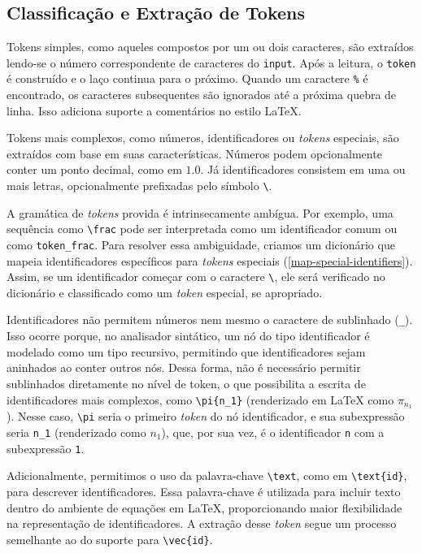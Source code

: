 \subsection{Classificação e Extração de Tokens}

Tokens simples, como aqueles compostos por um ou dois caracteres, são extraídos lendo-se o número correspondente de caracteres do \texttt{input}. Após a leitura, o \texttt{token} é construído e o laço continua para o próximo. Quando um caractere \texttt{\%} é encontrado, os caracteres subsequentes são ignorados até a próxima quebra de linha. Isso adiciona suporte a comentários no estilo \LaTeX{}.

Tokens mais complexos, como números, identificadores ou \textit{tokens} especiais, são extraídos com base em suas características. Números podem opcionalmente conter um ponto decimal, como em $1.0$. Já identificadores consistem em uma ou mais letras, opcionalmente prefixadas pelo símbolo \verb|\|.

A gramática de \textit{tokens} provida é intrinsecamente ambígua. Por exemplo, uma sequência como \verb|\frac| pode ser interpretada como um identificador comum ou como \verb"token_frac". Para resolver essa ambiguidade, criamos um dicionário que mapeia identificadores específicos para \textit{tokens} especiais (\autoref{map-special-identifiers}). Assim, se um identificador começar com o caractere \verb|\|, ele será verificado no dicionário e classificado como um \textit{token} especial, se apropriado.


\label{lexer-subexpression}
Identificadores não permitem números nem mesmo o caractere de sublinhado (\verb|_|). Isso ocorre porque, no analisador sintático, um nó do tipo identificador é modelado como um tipo recursivo, permitindo que identificadores sejam aninhados ao conter outros nós. Dessa forma, não é necessário permitir sublinhados diretamente no nível de token, o que possibilita a escrita de identificadores mais complexos, como \verb|\pi{n_1}| (renderizado em \LaTeX{} como $\pi_{n_1}$). Nesse caso, \verb|\pi| seria o primeiro \textit{token} do nó identificador, e sua subexpressão seria \verb|n_1| (renderizado como $n_1$), que, por sua vez, é o identificador \verb|n| com a subexpressão \verb|1|.

Adicionalmente, permitimos o uso da palavra-chave \verb|\text|, como em \verb|\text{id}|, para descrever identificadores. Essa palavra-chave é utilizada para incluir texto dentro do ambiente de equações em \LaTeX{}, proporcionando maior flexibilidade na representação de identificadores. A extração desse \textit{token} segue um processo semelhante ao do suporte para \verb|\vec{id}|.

